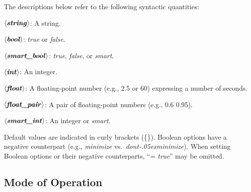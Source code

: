 \documentclass[a4paper,12pt]{article}
\def\qtybf#1{$\mathbf{\left<\textbf{\textit{#1\/}}\right>}$}
\renewcommand\_{\hbox{\textunderscore\kern-.05ex}}
\begin{document}
The descriptions below refer to the following syntactic quantities:

\begin{enum}
\item[\labelitemi] \qtybf{string}: A string.
\item[\labelitemi] \qtybf{bool\/}: \textit{true} or \textit{false}.
\item[\labelitemi] \qtybf{smart\_bool\/}: \textit{true}, \textit{false}, or
\textit{smart}.
\item[\labelitemi] \qtybf{int\/}: An integer.
\item[\labelitemi] \qtybf{float}: A floating-point number (e.g., 2.5 or 60)
expressing a number of seconds.
\item[\labelitemi] \qtybf{float\_pair\/}: A pair of floating-point numbers
(e.g., 0.6 0.95).
\item[\labelitemi] \qtybf{smart\_int\/}: An integer or \textit{smart}.
\end{enum}

Default values are indicated in curly brackets (\textrm{\{\}}). Boolean options
have a negative counterpart (e.g., \textit{minimize} vs.\
\textit{dont\_minimize}). When setting Boolean options or their negative
counterparts, ``= \textit{true\/}'' may be omitted.


\subsection{Mode of Operation}
\label{mode-of-operation}
\end{document}
